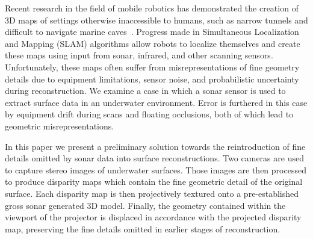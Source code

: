 \documentclass[a4paper,twoside]{article}
\begin{document}

\noindent Recent research in the field of mobile robotics has demonstrated the creation of 3D maps of settings otherwise inaccessible to humans, such as narrow tunnels and difficult to navigate marine caves~\cite{McVicker}. Progress made in Simultaneous Localization and Mapping (SLAM) algorithms allow robots to localize themselves and create these maps using input from sonar, infrared, and other scanning sensors.
 Unfortunately, these maps often suffer from misrepresentations of fine geometry details due to equipment limitations, sensor noise, and probabilistic uncertainty during reconstruction.
 We examine a case in which a sonar sensor is used to extract surface data in an underwater environment.
Error is furthered in this case by equipment drift during scans and floating occlusions, both of which lead to geometric misrepresentations.

In this paper we present a preliminary solution towards the reintroduction of fine details omitted by sonar data into surface reconstructions.  
Two cameras are used to capture stereo images of underwater surfaces.
Those images are then processed to produce disparity maps which contain the fine geometric detail of the original surface.
Each disparity map is then projectively textured onto a pre-established gross sonar generated 3D model. Finally, the geometry contained within the viewport of the projector is displaced in accordance with the projected disparity map, preserving the fine details omitted in earlier stages of reconstruction.

\end{document}
